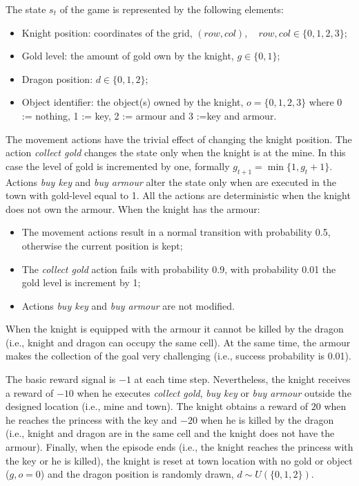 \par
The state $s_t$ of the game is represented by the following elements:
\begin{itemize}
\item Knight position: coordinates of the grid, $(row,col), \quad row,col \in \{0,1,2,3\};$
\item Gold level: the amount of gold own by the knight, $g \in \{0,1\}$;
\item Dragon position: $d \in \{0,1,2\}$;
\item Object identifier: the object(s) owned by the knight, $o=\{0,1,2,3\}$ where 0 := nothing, 1 := key, 2 := armour and 3 :=key and armour.
\end{itemize}
The movement actions have the trivial effect of changing the knight position. The
action \emph{collect gold} changes the state only when the knight is at the mine. In this case the level of gold is incremented by one, formally $g_{t+1}= \min \{1,g_t + 1\}$. Actions \emph{buy key} and \emph{buy armour} alter the state only when are executed in the town with gold-level equal to 1. All the actions are deterministic when the knight does not own the armour. When the knight has the armour: 
\begin{itemize}
\item The movement actions result in a normal transition with probability 0.5, otherwise the current position is kept;
\item The \emph{collect gold} action fails with probability 0.9, \ie with probability 0.01 the gold level is increment by 1;
\item Actions \emph{buy key} and \emph{buy armour} are not modified.
\end{itemize}
When the knight is equipped with the armour it cannot be killed by the dragon (i.e., knight and dragon can occupy the same cell). At the same time, the armour makes the collection of the goal very challenging (i.e., success probability is 0.01).\par
The basic reward signal is $-1$ at each time step. Nevertheless, the knight receives a reward of $-10$ when he executes \emph{collect gold}, \emph{buy key} or \emph{buy armour} outside the designed location (i.e., mine and town).  The knight obtains a reward of $20$ when he reaches the princess with the key and $-20$ when he is killed by the dragon (i.e., knight and dragon are in the same cell and the knight
does not have the armour). Finally, when the episode ends (i.e., the knight reaches the princess with the key or he is killed), the knight is reset at town location with no gold or object ($g,o= 0$) and the dragon position is randomly drawn, $d \sim U(\{0,1,2\})$.\par
